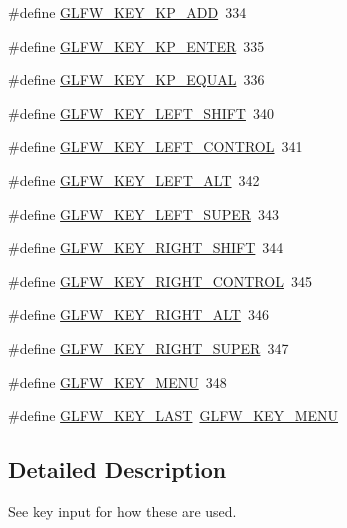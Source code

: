 \begin{DoxyCompactItemize}
\item 
\#define \hyperlink{group__keys_gad09c7c98acc79e89aa6a0a91275becac}{G\+L\+F\+W\+\_\+\+K\+E\+Y\+\_\+\+K\+P\+\_\+\+A\+D\+D}~334
\item 
\#define \hyperlink{group__keys_ga4f728f8738f2986bd63eedd3d412e8cf}{G\+L\+F\+W\+\_\+\+K\+E\+Y\+\_\+\+K\+P\+\_\+\+E\+N\+T\+E\+R}~335
\item 
\#define \hyperlink{group__keys_gaebdc76d4a808191e6d21b7e4ad2acd97}{G\+L\+F\+W\+\_\+\+K\+E\+Y\+\_\+\+K\+P\+\_\+\+E\+Q\+U\+A\+L}~336
\item 
\#define \hyperlink{group__keys_ga8a530a28a65c44ab5d00b759b756d3f6}{G\+L\+F\+W\+\_\+\+K\+E\+Y\+\_\+\+L\+E\+F\+T\+\_\+\+S\+H\+I\+F\+T}~340
\item 
\#define \hyperlink{group__keys_ga9f97b743e81460ac4b2deddecd10a464}{G\+L\+F\+W\+\_\+\+K\+E\+Y\+\_\+\+L\+E\+F\+T\+\_\+\+C\+O\+N\+T\+R\+O\+L}~341
\item 
\#define \hyperlink{group__keys_ga7f27dabf63a7789daa31e1c96790219b}{G\+L\+F\+W\+\_\+\+K\+E\+Y\+\_\+\+L\+E\+F\+T\+\_\+\+A\+L\+T}~342
\item 
\#define \hyperlink{group__keys_gafb1207c91997fc295afd1835fbc5641a}{G\+L\+F\+W\+\_\+\+K\+E\+Y\+\_\+\+L\+E\+F\+T\+\_\+\+S\+U\+P\+E\+R}~343
\item 
\#define \hyperlink{group__keys_gaffca36b99c9dce1a19cb9befbadce691}{G\+L\+F\+W\+\_\+\+K\+E\+Y\+\_\+\+R\+I\+G\+H\+T\+\_\+\+S\+H\+I\+F\+T}~344
\item 
\#define \hyperlink{group__keys_gad1ca2094b2694e7251d0ab1fd34f8519}{G\+L\+F\+W\+\_\+\+K\+E\+Y\+\_\+\+R\+I\+G\+H\+T\+\_\+\+C\+O\+N\+T\+R\+O\+L}~345
\item 
\#define \hyperlink{group__keys_ga687b38009131cfdd07a8d05fff8fa446}{G\+L\+F\+W\+\_\+\+K\+E\+Y\+\_\+\+R\+I\+G\+H\+T\+\_\+\+A\+L\+T}~346
\item 
\#define \hyperlink{group__keys_gad4547a3e8e247594acb60423fe6502db}{G\+L\+F\+W\+\_\+\+K\+E\+Y\+\_\+\+R\+I\+G\+H\+T\+\_\+\+S\+U\+P\+E\+R}~347
\item 
\#define \hyperlink{group__keys_ga9845be48a745fc232045c9ec174d8820}{G\+L\+F\+W\+\_\+\+K\+E\+Y\+\_\+\+M\+E\+N\+U}~348
\item 
\#define \hyperlink{group__keys_ga442cbaef7bfb9a4ba13594dd7fbf2789}{G\+L\+F\+W\+\_\+\+K\+E\+Y\+\_\+\+L\+A\+S\+T}~\hyperlink{group__keys_ga9845be48a745fc232045c9ec174d8820}{G\+L\+F\+W\+\_\+\+K\+E\+Y\+\_\+\+M\+E\+N\+U}
\end{DoxyCompactItemize}


\subsection{Detailed Description}
See key input for how these are used.

